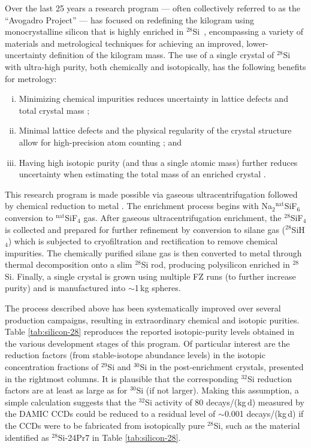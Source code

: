 \documentclass[final,5p]{elsarticle}
\def\si{$^{32}$Si\xspace}
\def\esi{$^{28}$Si\xspace}
\begin{document}
Over the last 25 years a research program --- often collectively referred to as the ``Avogadro Project'' --- has focused on redefining the kilogram using monocrystalline silicon that is highly enriched in  \esi\ \cite{seyfried,jertz, becker,friedrich,becker2,fujii},  encompassing a variety of materials and metrological techniques for achieving an improved, lower-uncertainty definition of the kilogram mass. The use of a single crystal of \esi with ultra-high purity, both chemically and isotopically, has the following benefits for metrology:
\begin{enumerate}[i)]
\item Minimizing chemical impurities reduces uncertainty in lattice defects and total crystal mass \cite{Agostino};
\item Minimal lattice defects and the physical regularity of the crystal structure allow for high-precision atom counting \cite{fujii}; and
\item Having high isotopic purity (and thus a single atomic mass) further reduces uncertainty when estimating the total mass of an enriched crystal \cite{pramann}.
\end{enumerate}

This research program is made possible via gaseous ultracentrifugation followed by chemical reduction to metal \cite{becker3,fujii}. The enrichment process begins with Na$_2$$^{\textrm{nat}}$SiF$_6$ conversion to $^{\textrm{nat}}$SiF$_4$ gas. After gaseous ultracentrifugation enrichment, the $^{28}$SiF$_4$ is collected and prepared for further refinement by conversion to silane gas ($^{28}$SiH$_4$) which is subjected to cryofiltration and rectification to remove chemical impurities. The chemically purified silane gas is then converted to metal through thermal decomposition onto a slim \esi rod, producing polysilicon enriched in \esi. 
Finally, a single crystal is grown using multiple FZ runs (to further increase purity) and is manufactured into $\sim$1\,kg spheres.

The process described above has been systematically improved over several production campaigns, resulting in extraordinary chemical and isotopic purities. Table \ref{tab:silicon-28} reproduces the reported isotopic-purity levels obtained in the various development stages of this program. Of particular interest are the reduction factors (from stable-isotope abundance levels) in the isotopic concentration fractions of $^{29}$Si and $^{30}$Si in the post-enrichment crystals, presented in the rightmost columns. It is plausible that the corresponding \si reduction factors are at least as large as for $^{30}$Si (if not larger). Making this assumption, a simple calculation suggests that the \si activity of 80 decays/(kg\,d) measured by the DAMIC CCDs could be reduced to a residual level of $\sim$0.001 decays/(kg\,d) if the CCDs were to be fabricated from isotopically pure \esi, such as the material identified as \esi-24Pr7 in Table \ref{tab:silicon-28}.
\end{document}
